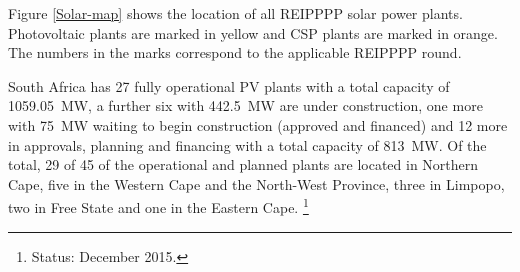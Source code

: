 
Figure \ref{Solar-map} shows the location of all REIPPPP solar power plants. Photovoltaic plants are marked in yellow and CSP plants are marked in orange. The numbers in the marks correspond to the applicable REIPPPP round.


%

South Africa has 27 fully operational PV plants with a total capacity of \SI{1059.05}{\mega\watt}, a further six with \SI{442.5}{\mega\watt} are under construction, one more with \SI{75}{\mega\watt} waiting to begin construction (approved and financed) and 12 more in approvals, planning and financing with a total capacity of \SI{813}{\mega\watt}. Of the total, 29 of 45 of the operational and planned plants are located in Northern Cape, five in the Western Cape and the North-West Province, three in Limpopo, two in Free State and one in the Eastern Cape. \cite{Forder2015}\footnote{Status: December 2015.}


\pagebreak

